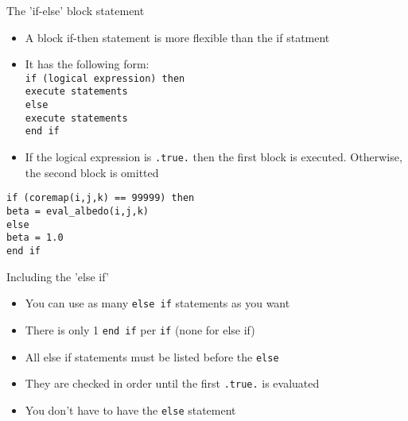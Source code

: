 \documentclass{beamer}
\begin{document}
\begin{frame}{The 'if-else' block statement}

  \begin{itemize}
    \item A block if-then statement is more flexible than the if statment
    \vfill\item It has the following form:\\
    \vfill\texttt{if (logical expression) then \\
	\hspace{0.5cm}execute statements  \\
	else \\
	\hspace{0.5cm}execute statements  \\
	end if \\}
    \item If the logical expression is \texttt{.true.} then the first block is executed. Otherwise, the second block is omitted
  \end{itemize}
  \vfill
  \texttt{if (coremap(i,j,k) == 99999) then \\
      \hspace{0.5cm} beta = eval\_albedo(i,j,k) \\
    else \\
      \hspace{0.5cm} beta = 1.0 \\
    end if
    }
  
\end{frame}
\begin{frame}{Including the 'else if'}
  \begin{itemize}
    \item You can use as many \texttt{else if} statements as you want
    \vfill\item There is only 1 \texttt{end if} per \texttt{if} (none for else if)
    \vfill\item All {else if} statements must be listed before the \texttt{else}
    \vfill\item They are checked in order until the first \texttt{.true.} is evaluated
    \vfill\item You don't have to have the \texttt{else} statement
  \end{itemize}
\end{frame}
\end{document}
